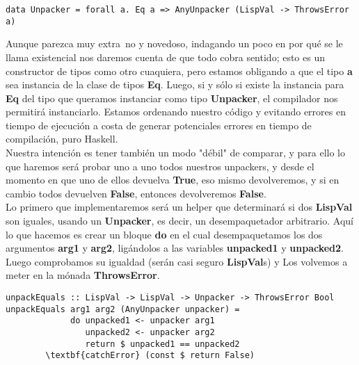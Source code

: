 \begin{minipage}{\linewidth}
\begin{scriptsize}
\begin{lstlisting}[frame=single]
data Unpacker = forall a. Eq a => AnyUnpacker (LispVal -> ThrowsError a)
\end{lstlisting}
\end{scriptsize}
\end{minipage}

Aunque parezca muy extra~no y novedoso, indagando un poco en por qu\'e se le llama existencial nos daremos cuenta de que todo cobra sentido; esto es un constructor de tipos como otro cuaquiera, pero estamos obligando a que el tipo \textbf{a} sea instancia de la clase de tipos \textbf{Eq}. Luego, si y s\'olo si existe la instancia para \textbf{Eq} del tipo que queramos instanciar como tipo \textbf{Unpacker}, el compilador nos permitir\'a instanciarlo. Estamos ordenando nuestro c\'odigo y evitando errores en tiempo de ejecuci\'on a costa de generar potenciales errores en tiempo de compilaci\'on, puro Haskell.\\

Nuestra intenci\'on es tener tambi\'en un modo "d\'ebil" de comparar, y para ello lo que haremos ser\'a probar uno a uno todos nuestros unpackers, y desde el momento en que uno de ellos devuelva \textbf{True}, eso mismo devolveremos, y si en cambio todos devuelven \textbf{False}, entonces devolveremos \textbf{False}.\\

Lo primero que implementaremos ser\'a un helper que determinar\'a si dos \textbf{LispVal} son iguales, usando un \textbf{Unpacker}, es decir, un desempaquetador arbitrario. Aqu\'i lo que hacemos es crear un bloque \textbf{do} en el cual desempaquetamos los dos argumentos \textbf{arg1} y \textbf{arg2}, lig\'andolos a las variables \textbf{unpacked1} y \textbf{unpacked2}. Luego comprobamos su igualdad (ser\'an casi seguro \textbf{LispVal}s) y Los volvemos a meter en la m\'onada \textbf{ThrowsError}.\\

\begin{minipage}{\linewidth}
\begin{footnotesize}
\begin{lstlisting}[frame=single]
unpackEquals :: LispVal -> LispVal -> Unpacker -> ThrowsError Bool
unpackEquals arg1 arg2 (AnyUnpacker unpacker) = 
             do unpacked1 <- unpacker arg1
                unpacked2 <- unpacker arg2
                return $ unpacked1 == unpacked2
        \textbf{catchError} (const $ return False)
\end{lstlisting}
\end{footnotesize}
\end{minipage}


